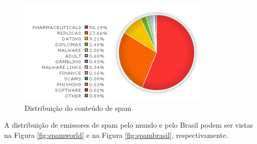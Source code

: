 \documentclass[a4paper,dvipdfm]{article}
\begin{document}
		\begin{figure}
			\centering
			\includegraphics [height=5cm] {Imagens/m86security/spamtype.png}
			\caption {Distribuição do conteúdo de spam}
			\label{fig:spamtype}
		\end{figure}

		A distribuição de emissores de spam pelo mundo e pelo Brasil podem ser vistas na Figura \ref{fig:spamworld} e na Figura \ref{fig:spambrasil}, respectivamente.
\end{document}
